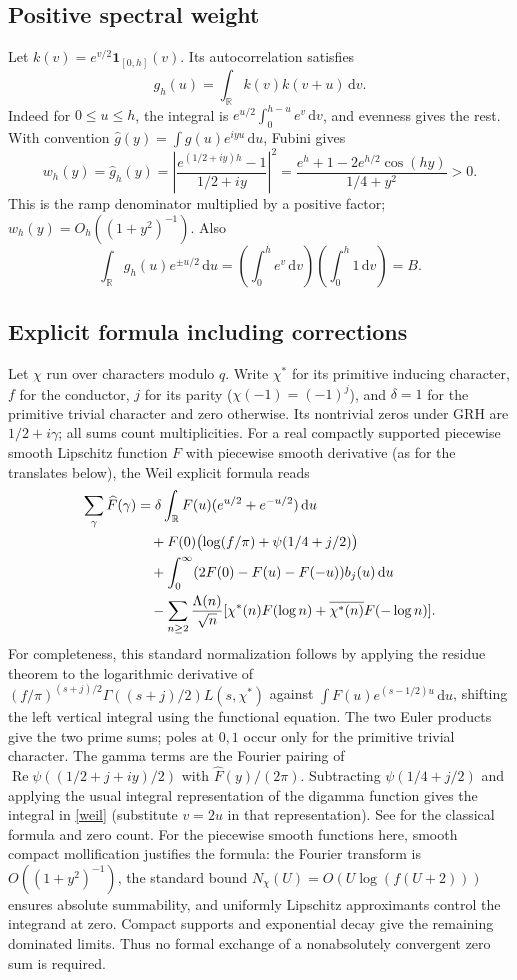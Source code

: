 \documentclass[11pt]{article}
\newcommand{\one}{\mathbf 1}
\newcommand{\dd}{\,\mathrm d}
\newcommand{\R}{\mathbb R}
\DeclareMathOperator{\Ree}{Re}
\begin{document}
\subsection{Positive spectral weight}
Let $k(v)=e^{v/2}\one_{[0,h]}(v)$. Its autocorrelation satisfies
\[
 g_h(u)=\int_{\R}k(v)k(v+u)\dd v.
\]
Indeed for $0\le u\le h$, the integral is $e^{u/2}\int_0^{h-u}e^v\dd v$, and evenness gives the rest. With convention $\widehat g(y)=\int g(u)e^{iyu}\dd u$, Fubini gives
\begin{equation}\label{weight}
 w_h(y)=\widehat g_h(y)=\left|\frac{e^{(1/2+iy)h}-1}{1/2+iy}\right|^2
 =\frac{e^h+1-2e^{h/2}\cos(hy)}{1/4+y^2}>0.
\end{equation}
This is the ramp denominator multiplied by a positive factor; $w_h(y)=O_h((1+y^2)^{-1})$. Also
\[
 \int_{\R}g_h(u)e^{\pm u/2}\dd u
 =\left(\int_0^h e^v\dd v\right)\left(\int_0^h1\dd v\right)=B.
\]

\subsection{Explicit formula including corrections}
Let $\chi$ run over characters modulo $q$. Write $\chi^*$ for its primitive inducing character, $f$ for the conductor, $j$ for its parity ($\chi(-1)=(-1)^j$), and $\delta=1$ for the primitive trivial character and zero otherwise. Its nontrivial zeros under GRH are $1/2+i\gamma$; all sums count multiplicities. For a real compactly supported piecewise smooth Lipschitz function $F$ with piecewise smooth derivative (as for the translates below), the Weil explicit formula reads
\begin{align}
 \sum_{\gamma}\widehat F(\gamma)
 &=\delta\int_{\R}F(u)(e^{u/2}+e^{-u/2})\dd u\notag\\
 &\quad+F(0)\bigl(\log(f/\pi)+\psi(1/4+j/2)\bigr)\notag\\
 &\quad+\int_0^\infty(2F(0)-F(u)-F(-u))b_j(u)\dd u\notag\\
 &\quad-\sum_{n\ge2}\frac{\Lambda(n)}{\sqrt n}
 [\chi^*(n)F(\log n)+\overline{\chi^*(n)}F(-\log n)].\label{weil}
\end{align}
For completeness, this standard normalization follows by applying the residue theorem to the logarithmic derivative of $(f/\pi)^{(s+j)/2}\Gamma((s+j)/2)L(s,\chi^*)$ against $\int F(u)e^{(s-1/2)u}\dd u$, shifting the left vertical integral using the functional equation. The two Euler products give the two prime sums; poles at $0,1$ occur only for the primitive trivial character. The gamma terms are the Fourier pairing of $\Ree\psi((1/2+j+iy)/2)$ with $\widehat F(y)/(2\pi)$. Subtracting $\psi(1/4+j/2)$ and applying the usual integral representation of the digamma function gives the integral in \eqref{weil} (substitute $v=2u$ in that representation). See \cite{cohen,dfm,kouk} for the classical formula and zero count. For the piecewise smooth functions here, smooth compact mollification justifies the formula: the Fourier transform is $O((1+y^2)^{-1})$, the standard bound $N_\chi(U)=O(U\log(f(U+2)))$ ensures absolute summability, and uniformly Lipschitz approximants control the integrand at zero. Compact supports and exponential decay give the remaining dominated limits. Thus no formal exchange of a nonabsolutely convergent zero sum is required.
\end{document}
